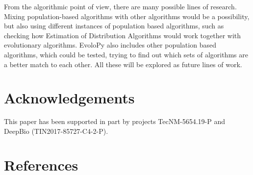 \documentclass[review]{elsarticle}
\begin{document}
From the algorithmic point of view, there are many possible lines of
research. Mixing population-based algorithms with other algorithms
would be a possibility, but also using different instances of
population based algorithms, such as checking how Estimation of
Distribution Algorithms would work together with evolutionary
algorithms. EvoloPy also includes other population based algorithms,
which could be tested, trying to find out which sets of algorithms are
a better match to each other. All these will be explored as future
lines of work.

\section{Acknowledgements}

This paper has been supported in part by projects TecNM-5654.19-P and DeepBio
(TIN2017-85727-C4-2-P).

\section*{References}



\end{document}

